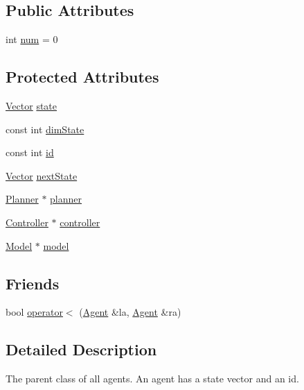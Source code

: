 \subsection*{Public Attributes}
\begin{DoxyCompactItemize}
\item 
int \hyperlink{classAgent_a7253eba145842d05f51375a1d8f7df91}{num} = 0
\end{DoxyCompactItemize}
\subsection*{Protected Attributes}
\begin{DoxyCompactItemize}
\item 
\hyperlink{Agent_8hpp_a5dd127bb3cb18b011cf5fd80a906e830}{Vector} \hyperlink{classAgent_a6ef1b669e841f34e42619a2429160dc7}{state}
\item 
const int \hyperlink{classAgent_aae845abfc5e48abee8efe8f1088ea5b4}{dim\+State}
\item 
const int \hyperlink{classAgent_af8b58fe9dafe460ed2ddf87435a7feed}{id}
\item 
\hyperlink{Agent_8hpp_a5dd127bb3cb18b011cf5fd80a906e830}{Vector} \hyperlink{classAgent_af6b03c80fd3fdc4bd34d3ca3027e67f2}{next\+State}
\item 
\hyperlink{classPlanner}{Planner} $\ast$ \hyperlink{classAgent_aa71be9f465a3d8eed4e3297d8aa49eb1}{planner}
\item 
\hyperlink{classController}{Controller} $\ast$ \hyperlink{classAgent_a35138f4fa7fa31760928b84680f7a886}{controller}
\item 
\hyperlink{classModel}{Model} $\ast$ \hyperlink{classAgent_a41c7b65f7ad35cc6756cf0313edaa9a0}{model}
\end{DoxyCompactItemize}
\subsection*{Friends}
\begin{DoxyCompactItemize}
\item 
bool \hyperlink{classAgent_ada5c7ad0216c88d7a21c2ae7825f2a81}{operator$<$} (\hyperlink{classAgent}{Agent} \&la, \hyperlink{classAgent}{Agent} \&ra)
\end{DoxyCompactItemize}


\subsection{Detailed Description}
The parent class of all agents. An agent has a state vector and an id. 

